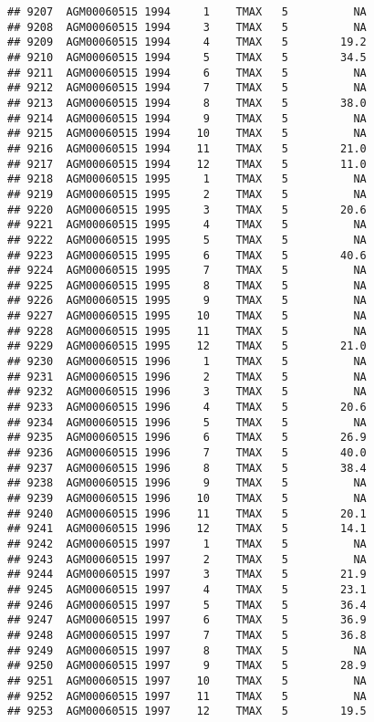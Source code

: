 \documentclass{article}\usepackage[]{graphicx}\usepackage[]{color}
\makeatletter
\newenvironment{kframe}{%
 \def\at@end@of@kframe{}%
 \ifinner\ifhmode%
  \def\at@end@of@kframe{\end{minipage}}%
  \begin{minipage}{\columnwidth}%
 \fi\fi%
 \def\FrameCommand##1{\hskip\@totalleftmargin \hskip-\fboxsep
 \colorbox{shadecolor}{##1}\hskip-\fboxsep
     \hskip-\linewidth \hskip-\@totalleftmargin \hskip\columnwidth}%
 \MakeFramed {\advance\hsize-\width
   \@totalleftmargin\z@ \linewidth\hsize
   \@setminipage}}%
 {\par\unskip\endMakeFramed%
 \at@end@of@kframe}
\newenvironment{knitrout}{}{} %
\makeatother
\begin{document}
\begin{knitrout}
\begin{kframe}
\begin{verbatim}
## 9207  AGM00060515 1994     1    TMAX   5          NA
## 9208  AGM00060515 1994     3    TMAX   5          NA
## 9209  AGM00060515 1994     4    TMAX   5        19.2
## 9210  AGM00060515 1994     5    TMAX   5        34.5
## 9211  AGM00060515 1994     6    TMAX   5          NA
## 9212  AGM00060515 1994     7    TMAX   5          NA
## 9213  AGM00060515 1994     8    TMAX   5        38.0
## 9214  AGM00060515 1994     9    TMAX   5          NA
## 9215  AGM00060515 1994    10    TMAX   5          NA
## 9216  AGM00060515 1994    11    TMAX   5        21.0
## 9217  AGM00060515 1994    12    TMAX   5        11.0
## 9218  AGM00060515 1995     1    TMAX   5          NA
## 9219  AGM00060515 1995     2    TMAX   5          NA
## 9220  AGM00060515 1995     3    TMAX   5        20.6
## 9221  AGM00060515 1995     4    TMAX   5          NA
## 9222  AGM00060515 1995     5    TMAX   5          NA
## 9223  AGM00060515 1995     6    TMAX   5        40.6
## 9224  AGM00060515 1995     7    TMAX   5          NA
## 9225  AGM00060515 1995     8    TMAX   5          NA
## 9226  AGM00060515 1995     9    TMAX   5          NA
## 9227  AGM00060515 1995    10    TMAX   5          NA
## 9228  AGM00060515 1995    11    TMAX   5          NA
## 9229  AGM00060515 1995    12    TMAX   5        21.0
## 9230  AGM00060515 1996     1    TMAX   5          NA
## 9231  AGM00060515 1996     2    TMAX   5          NA
## 9232  AGM00060515 1996     3    TMAX   5          NA
## 9233  AGM00060515 1996     4    TMAX   5        20.6
## 9234  AGM00060515 1996     5    TMAX   5          NA
## 9235  AGM00060515 1996     6    TMAX   5        26.9
## 9236  AGM00060515 1996     7    TMAX   5        40.0
## 9237  AGM00060515 1996     8    TMAX   5        38.4
## 9238  AGM00060515 1996     9    TMAX   5          NA
## 9239  AGM00060515 1996    10    TMAX   5          NA
## 9240  AGM00060515 1996    11    TMAX   5        20.1
## 9241  AGM00060515 1996    12    TMAX   5        14.1
## 9242  AGM00060515 1997     1    TMAX   5          NA
## 9243  AGM00060515 1997     2    TMAX   5          NA
## 9244  AGM00060515 1997     3    TMAX   5        21.9
## 9245  AGM00060515 1997     4    TMAX   5        23.1
## 9246  AGM00060515 1997     5    TMAX   5        36.4
## 9247  AGM00060515 1997     6    TMAX   5        36.9
## 9248  AGM00060515 1997     7    TMAX   5        36.8
## 9249  AGM00060515 1997     8    TMAX   5          NA
## 9250  AGM00060515 1997     9    TMAX   5        28.9
## 9251  AGM00060515 1997    10    TMAX   5          NA
## 9252  AGM00060515 1997    11    TMAX   5          NA
## 9253  AGM00060515 1997    12    TMAX   5        19.5

\end{verbatim}
\end{kframe}
\end{knitrout}
\end{document}
